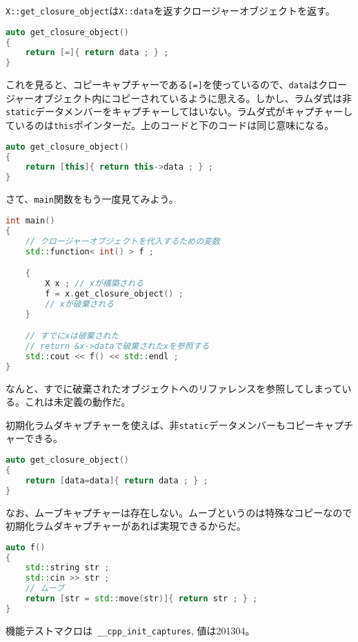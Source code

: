 \lstinline!X::get_closure_object!は\lstinline!X::data!を返すクロージャーオブジェクトを返す。

\begin{lstlisting}[language=C++]
auto get_closure_object()
{
    return [=]{ return data ; } ;
}
\end{lstlisting}

これを見ると、コピーキャプチャーである\lstinline![=]!を使っているので、\lstinline!data!はクロージャーオブジェクト内にコピーされているように思える。しかし、ラムダ式は非\lstinline!static!データメンバーをキャプチャーしてはいない。ラムダ式がキャプチャーしているのは\lstinline!this!ポインターだ。上のコードと下のコードは同じ意味になる。

\begin{lstlisting}[language=C++]
auto get_closure_object()
{
    return [this]{ return this->data ; } ;
}
\end{lstlisting}

さて、\lstinline!main!関数をもう一度見てみよう。

\begin{lstlisting}[language=C++]
int main()
{
    // クロージャーオブジェクトを代入するための変数
    std::function< int() > f ;

    {
        X x ; // xが構築される
        f = x.get_closure_object() ;
        // xが破棄される
    }

    // すでにxは破棄された
    // return &x->dataで破棄されたxを参照する
    std::cout << f() << std::endl ;
}
\end{lstlisting}

なんと、すでに破棄されたオブジェクトへのリファレンスを参照してしまっている。これは未定義の動作だ。

初期化ラムダキャプチャーを使えば、非\lstinline!static!データメンバーもコピーキャプチャーできる。

\begin{lstlisting}[language=C++]
auto get_closure_object()
{
    return [data=data]{ return data ; } ;
}
\end{lstlisting}

なお、ムーブキャプチャーは存在しない。ムーブというのは特殊なコピーなので初期化ラムダキャプチャーがあれば実現できるからだ。

\begin{lstlisting}[language=C++]
auto f()
{
    std::string str ;
    std::cin >> str ;
    // ムーブ
    return [str = std::move(str)]{ return str ; } ;
}
\end{lstlisting}

機能テストマクロは~\lstinline!__cpp_init_captures!, 値は201304。
